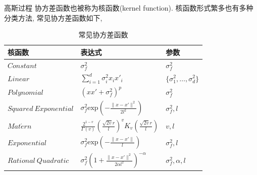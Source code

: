 \begin{frame}[fragile]{高斯过程}
    协方差函数也被称为核函数(kernel function). 核函数形式繁多也有多种分类方法, 常见协方差函数如下,

        \begin{table}[h]
            \centering
            \caption{常见协方差函数}
            \begin{tabular}{lll}
            \hline
            \multicolumn{1}{l}{核函数}   & \multicolumn{1}{l}{表达式} & \multicolumn{1}{l}{参数} \\ \hline
            $Constant$                    &    $\sigma^{2}_{f}$      &   $\sigma^{2}_{f}$  \\
            $Linear$                      &  $\sum^{d}_{i=1}\sigma^{2}_{i}x_{i}x'_{i}$ & $\{\sigma^{2}_{1},\dots,\sigma^{2}_{d}\}$        \\
            $Polynomial$                  &  $(xx'+\sigma^{2}_{f})^{p}$ &     $\sigma^{2}_{f}$    \\
            $Squared\ Exponential$     & $\sigma^{2}_{f}\mathrm{exp}\left(-\frac{\|x-x'\|^{2}}{2l^{2}}\right)$ & $\sigma^{2}_{f},l$   \\
            $Mat\acute{e}rn$ &    $\frac{2^{1-v}}{\Gamma(v)} \left(\frac{\sqrt{2v}r}{l}\right)^{v}K_{v}\left(\frac{\sqrt{2v}r}{l}\right)$ &  $v,l$  \\
            $Exponential$  &   $\sigma^{2}_{f}\mathrm{exp}\left(-\frac{\|x-x'\|}{l}\right)$  &  $\sigma^{2}_{f},l$   \\
            $Rational\ Quadratic$ &   $\sigma^{2}_{f}\left(1+\frac{\|x-x'\|^{2}}{2\alpha l^{2}}\right)^{-\alpha}$  &  $\sigma^{2}_{f},\alpha,l$   \\ \hline
            \end{tabular}
        \end{table}
\end{frame}


